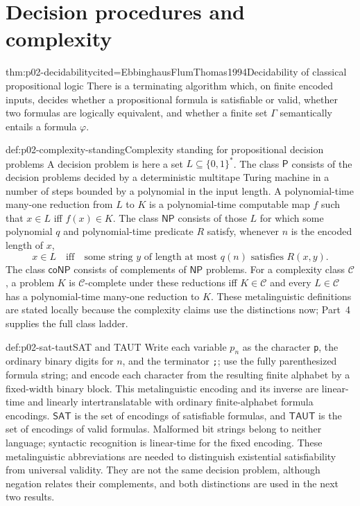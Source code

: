 \section{Decision procedures and complexity}
\label{sec:p02-prop-decision-complexity}

\begin{hbtheorem}{thm:p02-decidability}{cited=EbbinghausFlumThomas1994}{Decidability of classical propositional logic}
There is a terminating algorithm which, on finite encoded inputs, decides
whether a propositional formula is satisfiable or valid, whether two formulas
are logically equivalent, and whether a finite set \(\Gamma\) semantically
entails a formula \(\varphi\).
\end{hbtheorem}

\begin{hbconvention}{def:p02-complexity-standing}{Complexity standing for propositional decision problems}
A decision problem is here a set \(L\subseteq\{0,1\}^*\).  The class
\(\mathsf P\) consists of the decision problems decided by a deterministic
multitape Turing machine in a number of steps bounded by a polynomial in the
input length.  A polynomial-time
many-one reduction from \(L\) to \(K\) is a polynomial-time computable map
\(f\) such that \(x\in L\) iff \(f(x)\in K\).  The class \(\mathsf{NP}\)
consists of those \(L\) for which some polynomial \(q\) and polynomial-time
predicate \(R\) satisfy, whenever \(n\) is the encoded length of \(x\),
\[
 x\in L\quad\text{iff}\quad
 \text{some string }y\text{ of length at most }q(n)\text{ satisfies }R(x,y).
\]
The class \(\mathsf{coNP}\) consists of complements of \(\mathsf{NP}\)
problems.  For a complexity class \(\mathcal C\), a problem \(K\) is
\(\mathcal C\)-complete under these reductions iff \(K\in\mathcal C\) and
every \(L\in\mathcal C\) has a polynomial-time many-one reduction to \(K\).
These metalinguistic definitions are stated locally because the complexity
claims use the distinctions now; Part~4 supplies the full class ladder.
\end{hbconvention}

\begin{hbdefinition}{def:p02-sat-taut}{SAT and TAUT}
Write each variable \(p_n\) as the character \texttt{p}, the ordinary binary
digits for \(n\), and the terminator \texttt{;}; use the fully parenthesized formula string;
and encode each character from the resulting finite alphabet by a fixed-width
binary block.  This metalinguistic encoding and its inverse are linear-time
and linearly intertranslatable with ordinary finite-alphabet formula encodings.
\(\mathsf{SAT}\) is the set of encodings of satisfiable formulas, and
\(\mathsf{TAUT}\) is the set of encodings of valid formulas.
Malformed bit strings belong to neither language; syntactic recognition is
linear-time for the fixed encoding.
These metalinguistic abbreviations are needed to distinguish existential
satisfiability from universal validity.  They are not the same decision
problem, although negation relates their complements, and both distinctions
are used in the next two results.
\end{hbdefinition}

